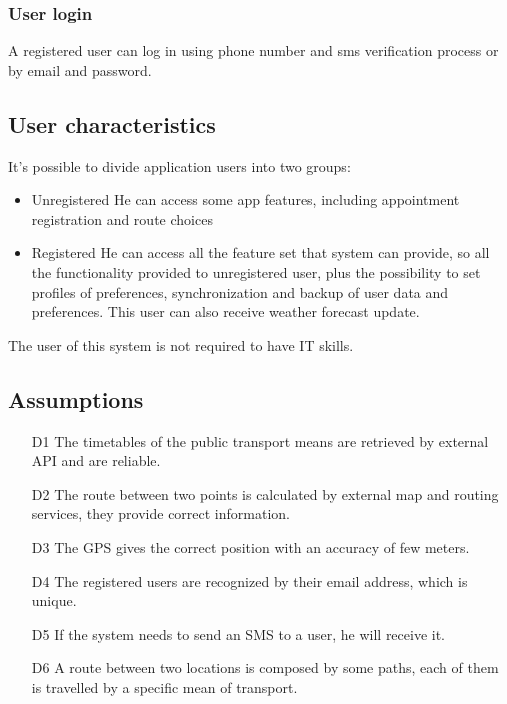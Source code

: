 \subsubsection{User login}

A registered user can log in using phone number and sms verification process or by email and password.



\subsection{User characteristics}

It’s possible to divide application users into two groups:

\begin{itemize}
	\item Unregistered
	\subitem He can access some app features, including appointment registration and route choices
	\item Registered
	\subitem He can access all the feature set that system can provide, so all the functionality provided to unregistered user, plus the possibility to set profiles of preferences, synchronization and backup of user data and preferences. This user can also receive weather forecast update.
\end{itemize}

The user of this system is not required to have IT skills.

\subsection{Assumptions}

\begin{itemize}
	\item[D1] The timetables of the public transport means are retrieved by external API and are reliable.
	\item[D2]The route between two points is calculated by external map and routing services, they provide correct information.
	\item[D3]The GPS gives the correct position with an accuracy of few meters.
	\item[D4]The registered users are recognized by their email address, which is unique.
	\item[D5]If the system needs to send an SMS to a user, he will receive it.
	\item[D6]A route between two locations is composed by some paths, each of them is travelled by a specific mean of transport.
\end{itemize}



